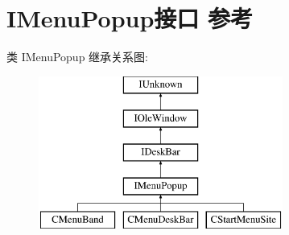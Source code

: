 \hypertarget{interface_i_menu_popup}{}\section{I\+Menu\+Popup接口 参考}
\label{interface_i_menu_popup}
类 I\+Menu\+Popup 继承关系图\+:\begin{figure}[H]
\begin{center}
\leavevmode
\includegraphics[height=5.000000cm]{interface_i_menu_popup}
\end{center}
\end{figure}
